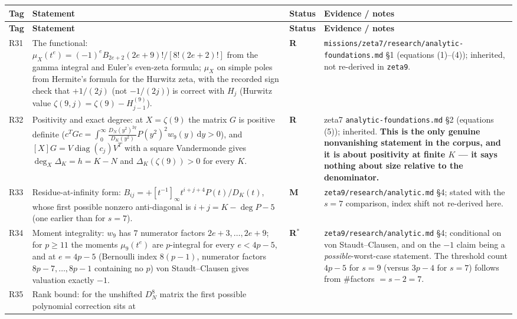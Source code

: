 \documentclass[11pt]{article}
\newcommand{\stR}{\textcolor{okgreen}{\textbf{R}}}
\newcommand{\stC}{\textcolor{okgreen}{\textbf{R$^{*}$}}}
\newcommand{\stM}{\textcolor{numblue}{\textbf{M}}}
\newcommand{\dd}{\,\mathrm{d}}
\begin{document}
\begin{longtable}{@{}p{}p{}p{}p{}@{}}
\toprule \textbf{Tag} & \textbf{Statement} & \textbf{Status} & \textbf{Evidence / notes} \\ \midrule
\endfirsthead
\toprule \textbf{Tag} & \textbf{Statement} & \textbf{Status} & \textbf{Evidence / notes} \\ \midrule
\endhead
R31 & The functional: $\mu_X(t^{e})=(-1)^eB_{2e+2}(2e+9)!/[8!(2e+2)!]$ from the gamma integral and
      Euler's even-zeta formula; $\mu_X$ on simple poles from Hermite's formula for the Hurwitz zeta,
      with the recorded sign check that $+1/(2j)$ (not $-1/(2j)$) is correct with $H_j$ (Hurwitz value
      $\zeta(9,j)=\zeta(9)-H_{j-1}^{(9)}$). & \stR & \texttt{missions/zeta7/research/analytic-foundations.md}
      \S1 (equations (1)--(4)); inherited, not re-derived in \texttt{zeta9}. \\
R32 & Positivity and exact degree: at $X=\zeta(9)$ the matrix $G$ is positive definite
      ($c^{T}Gc=\int_0^\infty\frac{D_N(y^{2})^{2q}}{D_K(y^{2})}P(y^{2})^{2}w_9(y)\dd y>0$), and
      $[X]G=V\operatorname{diag}(c_j)V^{T}$ with a square Vandermonde gives
      $\deg_X\Delta_K=h=K-N$ and $\Delta_K(\zeta(9))>0$ for every $K$. & \stR
      & zeta7 \texttt{analytic-foundations.md} \S2 (equations (5)); inherited. \textbf{This is the only
      genuine nonvanishing statement in the corpus, and it is about positivity at finite $K$ --- it
      says nothing about size relative to the denominator.} \\
R33 & Residue-at-infinity form: $B_{ij}=+[t^{-1}]_\infty t^{i+j+4}P(t)/D_K(t)$, whose first possible
      nonzero anti-diagonal is $i+j=K-\deg P-5$ (one earlier than for $s=7$). & \stM
      & \texttt{zeta9/research/analytic.md} \S4; stated with the $s=7$ comparison, index shift not
      re-derived here. \\
R34 & Moment integrality: $w_9$ has $7$ numerator factors $2e+3,\dots,2e+9$; for $p\ge11$ the moments
      $\mu_9(t^{e})$ are $p$-integral for every $e<4p-5$, and at $e=4p-5$ (Bernoulli index $8(p-1)$,
      numerator factors $8p-7,\dots,8p-1$ containing no $p$) von Staudt--Clausen gives valuation
      exactly $-1$. & \stC & \texttt{zeta9/research/analytic.md} \S4; conditional on
      von Staudt--Clausen, and on the $-1$ claim being a \emph{possible}-worst-case statement. The
      threshold count $4p-5$ for $s=9$ (versus $3p-4$ for $s=7$) follows from \#factors $=s-2=7$. \\
R35 & Rank bound: for the unshifted $D_N^{8}$ matrix the first possible polynomial correction sits at

\end{longtable}
\end{document}
